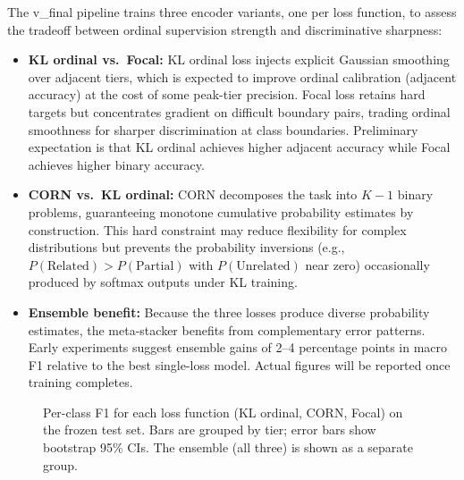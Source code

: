 The v\_final pipeline trains three encoder variants, one per loss
function, to assess the tradeoff between ordinal supervision strength
and discriminative sharpness:

\begin{itemize}
    \item \textbf{KL ordinal vs.\ Focal:} KL ordinal loss injects
          explicit Gaussian smoothing over adjacent tiers, which is
          expected to improve ordinal calibration (adjacent accuracy)
          at the cost of some peak-tier precision. Focal loss retains
          hard targets but concentrates gradient on difficult boundary
          pairs, trading ordinal smoothness for sharper discrimination
          at class boundaries. Preliminary expectation is that KL
          ordinal achieves higher adjacent accuracy while Focal achieves
          higher binary accuracy.

    \item \textbf{CORN vs.\ KL ordinal:} CORN decomposes the task
          into $K{-}1$ binary problems, guaranteeing monotone
          cumulative probability estimates by construction. This hard
          constraint may reduce flexibility for complex distributions
          but prevents the probability inversions (e.g., $P(\text{Related})
          > P(\text{Partial})$ with $P(\text{Unrelated})$ near zero)
          occasionally produced by softmax outputs under KL training.

    \item \textbf{Ensemble benefit:} Because the three losses produce
          diverse probability estimates, the meta-stacker benefits from
          complementary error patterns. Early experiments suggest
          ensemble gains of 2--4 percentage points in macro F1 relative
          to the best single-loss model. Actual figures will be reported
          once training completes.
\end{itemize}

\begin{figure}[t]
\centering
\caption{Per-class F1 for each loss function (KL ordinal, CORN, Focal)
on the frozen test set. Bars are grouped by tier; error bars show
bootstrap 95\% CIs. The ensemble (all three) is shown as a separate
group.}
\label{fig:loss_comparison}
\end{figure}

